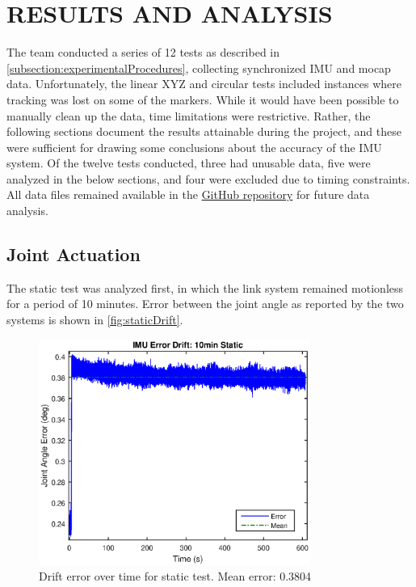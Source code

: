 \documentclass[letterpaper, 10 pt, conference]{ieeeconf}  %
\begin{document}
\section{RESULTS AND ANALYSIS}
The team conducted a series of 12 tests as described in \autoref{subsection:experimentalProcedures}, collecting synchronized IMU and mocap data. Unfortunately, the linear XYZ and circular tests included instances where tracking was lost on some of the markers. While it would have been possible to manually clean up the data, time limitations were restrictive. Rather, the following sections document the results attainable during the project, and these were sufficient for drawing some conclusions about the accuracy of the IMU system. Of the twelve tests conducted, three had unusable data, five were analyzed in the below sections, and four were excluded due to timing constraints. All data files remained available in the \href{https://github.com/ChrisBove/HandPoseTracking/}{GitHub repository} for future data analysis.

\subsection{Joint Actuation}
The static test was analyzed first, in which the link system remained motionless for a period of 10 minutes. Error between the joint angle as reported by the two systems is shown in \autoref{fig:staticDrift}.

\begin{figure}[thpb]
	\centering
	\includegraphics[width = 3.5in]{static_drift.eps}
    \caption{Drift error over time for static test. Mean error: 0.3804\degree}
    \label{fig:staticDrift}
\end{figure}
\end{document}
